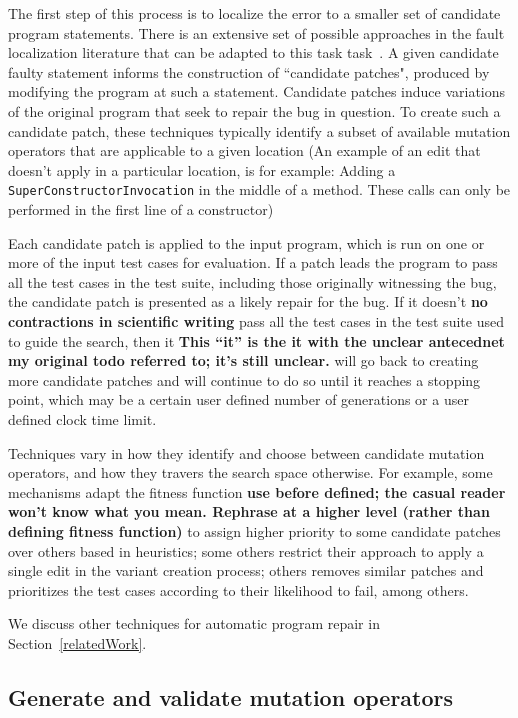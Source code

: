 \documentclass[conference]{IEEEtran}
\newcommand{\todo}[1]
  {{\scriptsize \textbf{\color{red} {#1}}}}
\begin{document}
The first step of this process is to localize the error to a smaller set of
candidate program statements. There is an extensive set of possible approaches
in the fault localization literature that can be adapted to this task
task~\cite{Jones05,Jones02,Chen02,Qi2013}.  A given candidate faulty statement informs
the construction of 
``candidate patches", produced by modifying the program at such a
statement. Candidate patches induce variations of the original program 
that seek to repair the bug in question. To 
create such a candidate patch, these techniques typically identify a subset of
available mutation operators that are applicable to a given location (An example of an edit that doesn't apply in a particular location, is for example: Adding a \texttt{SuperConstructorInvocation} in the middle of a method. These calls can only be performed in the first line of a constructor)   

Each candidate patch is applied to the input program, which is run on
one or more of the input test cases for evaluation.  If a patch leads the
program to 
pass all the test cases in the test suite, including those originally witnessing
the bug, the candidate patch is presented as a likely repair for the bug. 
If it doesn't\todo{no contractions in scientific writing} pass all the test cases in 
the test suite used to guide the search, then it\todo{This ``it'' is the it with the unclear antecednet my original todo referred to; it's still unclear.} will go back to creating more candidate patches and will 
continue to do so until it reaches a stopping point, which may be a certain user 
defined number of generations or a user defined clock time limit.

Techniques vary in how they identify and choose between candidate mutation
operators, and how they travers the search space otherwise. For example, some
mechanisms adapt the fitness function\todo{use before defined; the casual reader
  won't know what you mean.  Rephrase at a higher level (rather than defining
  fitness function)} to assign higher priority to some candidate patches over others based in heuristics; some others restrict their approach to apply a single edit in the variant creation process; others removes similar patches and prioritizes the test cases according to their likelihood to fail, among others. 

We discuss other techniques for automatic program repair in
Section~\ref{relatedWork}.

\subsection{Generate and validate mutation operators} 
\label{categorization}
\end{document}

